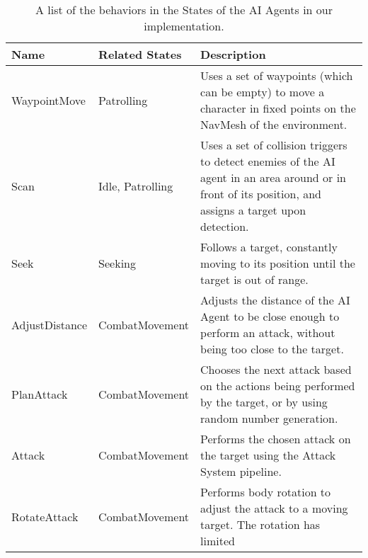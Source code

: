 \begin{table}[!h]
    \begin{center}
      \caption{A list of the behaviors in the States of the AI Agents in our implementation.}
      \label{tab:ai-behaviors}
      \begin{tabular}{ >{\small}w{l}{6em} >{\small}w{l}{7em} >{\small}m{17em} } %
        \addlinespace
        \toprule
        \bf Name       & \bf Related States  & \bf Description                              \\
        \midrule
        WaypointMove   & Patrolling          & Uses a set of waypoints (which can be empty)
                                               to move a character in fixed points on the 
                                               NavMesh of the environment.                  \\
        Scan           & Idle, Patrolling    & Uses a set of collision triggers to detect   
                                               enemies of the AI agent in an area around
                                               or in front of its position, and assigns a 
                                               target upon detection.                       \\
        Seek           & Seeking             & Follows a target, constantly moving to its
                                               position until the target is out of range.   \\
        AdjustDistance & CombatMovement      & Adjusts the distance of the AI Agent to be 
                                               close enough to perform an attack, without
                                               being too close to the target.               \\
        PlanAttack     & CombatMovement      & Chooses the next attack based on the actions 
                                               being performed by the target, or by using
                                               random number generation.                    \\
        Attack         & CombatMovement      & Performs the chosen attack on the target 
                                               using the Attack System pipeline.            \\
        RotateAttack   & CombatMovement      & Performs body rotation to adjust the attack 
                                               to a moving target. The rotation has limited 

\end{tabular}
\end{center}
\end{table}
